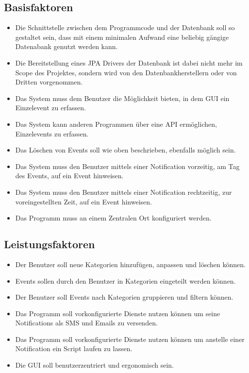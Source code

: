 \documentclass[11pt,titelpage]{scrartcl}
\begin{document}
\subsection{Basisfaktoren}
\begin{itemize}

\item Die Schnittstelle zwischen dem Programmcode und der Datenbank soll so gestaltet sein, dass mit einem minimalen
Aufwand eine beliebig gängige Datenabank genutzt werden kann.


\item
Die Bereitstellung eines JPA Drivers der Datenbank ist dabei nicht mehr im Scope des Projektes, sondern wird von den
Datenbankherstellern oder von Dritten vorgenommen.

\item
Das System muss dem Benutzer die Möglichkeit bieten, in dem GUI ein Einzelevent zu erfassen.


\item
Das System kann anderen Programmen über eine API ermöglichen, Einzelevents zu erfassen.

\item
Das Löschen von Events soll wie oben beschrieben, ebenfalls möglich sein.


\item
Das System muss den Benutzer mittels einer Notification vorzeitig, am Tag des  Events, auf ein Event hinweisen.
\item
Das System muss den Benutzer mittels einer Notification rechtzeitig, zur voreingestellten Zeit, auf ein Event hinweisen.

\item
Das Programm muss an einem Zentralen Ort konfiguriert werden.

\end{itemize}

\subsection{Leistungsfaktoren}
\begin{itemize}
\item
Der Benutzer soll neue Kategorien hinzufügen, anpassen und löschen können.
\item
Events sollen durch den Benutzer in Kategorien eingeteilt werden können.
\item
Der Benutzer soll Events nach Kategorien gruppieren und filtern können.
\item
Das Programm soll vorkonfigurierte Dienste nutzen können um seine Notifications als SMS und Emails zu versenden.
\item
Das Programm soll vorkonfigurierte Dienste nutzen können um anstelle einer Notification ein Script laufen zu lassen.
\item
Die GUI soll benutzerzentriert und ergonomisch sein.
\end{itemize}
\end{document}

